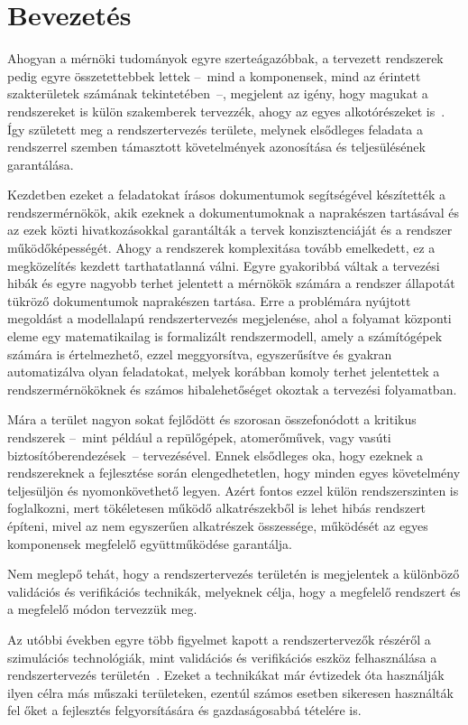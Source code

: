 \chapter{Bevezetés}
Ahogyan a mérnöki tudományok egyre szerteágazóbbak, a tervezett rendszerek pedig egyre összetettebbek lettek --~mind a komponensek, mind az érintett szakterületek számának tekintetében~--, megjelent az igény, hogy magukat a rendszereket is külön szakemberek tervezzék, ahogy az egyes alkotórészeket is~\cite{Gianni2017}.
Így született meg a rendszertervezés területe, melynek elsődleges feladata a rendszerrel szemben támasztott követelmények azonosítása és teljesülésének garantálása.

Kezdetben ezeket a feladatokat írásos dokumentumok segítségével készítették a rendszermérnökök, akik ezeknek a dokumentumoknak a naprakészen tartásával és az ezek közti hivatkozásokkal garantálták a tervek konzisztenciáját és a rendszer működőképességét.
Ahogy a rendszerek komplexitása tovább emelkedett, ez a megközelítés kezdett tarthatatlanná válni. Egyre gyakoribbá váltak a tervezési hibák és egyre nagyobb terhet jelentett a mérnökök számára a rendszer állapotát tükröző dokumentumok naprakészen tartása.
Erre a problémára nyújtott megoldást a modellalapú rendszertervezés megjelenése, ahol a folyamat központi eleme egy matematikailag is formalizált rendszermodell, amely a számítógépek számára is értelmezhető, ezzel meggyorsítva, egyszerűsítve és gyakran automatizálva olyan feladatokat, melyek korábban komoly terhet jelentettek a rendszermérnököknek és számos hibalehetőséget okoztak a tervezési folyamatban.

Mára a terület nagyon sokat fejlődött és szorosan összefonódott a kritikus rendszerek --~mint például a repülőgépek, atomerőművek, vagy vasúti biztosítóberendezések~-- tervezésével. Ennek elsődleges oka, hogy ezeknek a rendszereknek a fejlesztése során elengedhetetlen, hogy minden egyes követelmény teljesüljön és nyomonkövethető legyen.
Azért fontos ezzel külön rendszerszinten is foglalkozni, mert tökéletesen működő alkatrészekből is lehet hibás rendszert építeni, mivel az nem egyszerűen alkatrészek összessége, működését az egyes komponensek megfelelő együttműködése garantálja.

Nem meglepő tehát, hogy a rendszertervezés területén is megjelentek a különböző validációs és verifikációs technikák, melyeknek célja, hogy a megfelelő rendszert és a megfelelő módon tervezzük meg.

Az utóbbi években egyre több figyelmet kapott a rendszertervezők részéről a szimulációs technológiák, mint validációs és verifikációs eszköz felhasználása a rendszertervezés területén~\cite{Ma_2022}.
Ezeket a technikákat már évtizedek óta használják ilyen célra más műszaki területeken, ezentúl számos esetben sikeresen használták fel őket a fejlesztés felgyorsítására és gazdaságosabbá tételére is.

